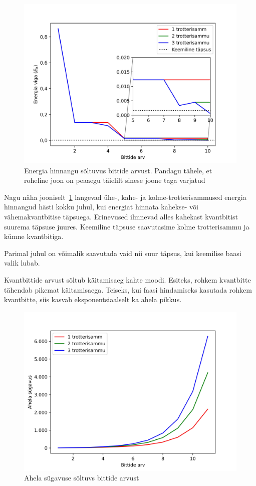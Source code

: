 \documentclass[12pt]{report}
\begin{document}
\begin{figure}[h]
    \centering
    \includegraphics{trotsteps.jpg}
    \caption{Energia hinnangu sõltuvus bittide arvust. Pandagu tähele, et roheline joon on peaaegu täielilt sinese joone taga varjatud}
    \label{fig:trotsteps}
\end{figure}

Nagu näha jooniselt~\ref{fig:trotsteps} langevad ühe-, kahe- ja kolme-trotterisammused energia hinnangud hästi kokku juhul, kui energiat hinnata kahekse- või vähemakvantbitise täpsuega.
Erinevused ilmnevad alles kahekast kvantbitist suurema täpsuse juures.
Keemiline täpsuse saavutasime kolme trotterisammu ja kümne kvantbitiga.

Parimal juhul on võimalik saavutada vaid nii suur täpsus, kui keemilise baasi valik lubab.

Kvantbittide arvust sõltub käitamisaeg kahte moodi.
Esiteks, rohkem kvantbitte tähendab pikemat käitamisaega.
Teiseks, kui faasi hindamiseks kasutada rohkem kvantbitte, siis kasvab eksponentsiaalselt ka ahela pikkus.

\begin{figure}[h]
    \centering
    \includegraphics{depths.jpg}
    \caption{Ahela sügavuse sõltuvs bittide arvust}
    \label{fig:depths}
\end{figure}
\end{document}

